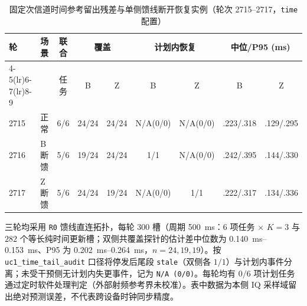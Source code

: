 \begin{table}[t]
\centering
\caption{固定次信道时间参考留出残差与单侧馈线断开恢复实例（轮次 2715--2717，\texttt{time} 配置）}
\label{tab:p2_time}
\setlength{\tabcolsep}{1.2pt}
\scriptsize
\begin{tabular}{@{}llccccccc@{}}
\toprule
\textbf{轮} & \textbf{场景} & \textbf{联合} & \multicolumn{2}{c}{\textbf{覆盖}} & \multicolumn{2}{c}{\textbf{计划内恢复}} & \multicolumn{2}{c}{\textbf{中位/P95 (ms)}} \\
\cmidrule(lr){4-5}\cmidrule(lr){6-7}\cmidrule(lr){8-9}
 & & 任务 & B & Z & B & Z & B & Z \\
\midrule
2715 & 正常   & 6/6 & 24/24 & 24/24 & N/A(0/0) & N/A(0/0) & .223/.318 & .129/.295 \\
2716 & B断馈  & 5/6 & 19/24 & 24/24 & 1/1      & N/A(0/0) & .242/.395 & .144/.330 \\
2717 & Z断馈  & 5/6 & 24/24 & 19/24 & N/A(0/0) & 1/1      & .222/.317 & .134/.336 \\
\bottomrule
\end{tabular}
\par\smallskip
\raggedright\scriptsize
三轮均采用 \texttt{R0} 馈线直连拓扑，每轮 $300$ 槽（周期 \SI{500}{ms}：$6$ 项任务 $\times$ $K{=}3$ 与 $282$ 个等长纯时间更新槽；双侧共覆盖探针的估计差中位数为 \SIrange{0.140}{0.153}{ms}、P95 为 \SIrange{0.202}{0.264}{ms}，$n{=}24,19,19$）。按 \texttt{uc1\_time\_tail\_audit} 口径将停发后尾段 \texttt{stale}（双侧各 $1/1$）与计划内事件分离；未受干预侧无计划内失更事件，记为 \texttt{N/A (0/0)}。每轮均有 $0/6$ 项计划任务通过定时软件处理判定（外部射频参考界未校准）。表中数据为本侧 IQ 采样域留出绝对预测误差，不代表跨设备时钟同步精度。
\end{table}
